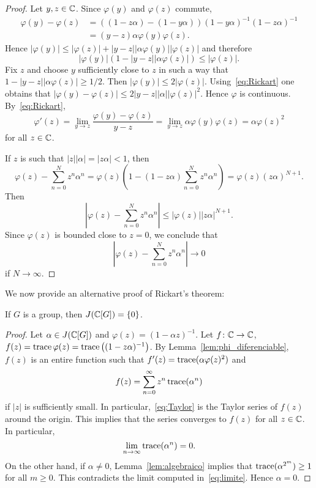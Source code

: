 \begin{proof}	
	Let $y,z\in\mathbb{C}$. Since $\varphi(y)$ and $\varphi(z)$ commute, 
	\begin{equation}
		\label{eq:Rickart}
		\begin{aligned}
			\varphi(y)-\varphi(z)&=\left( (1-z\alpha)-(1-y\alpha)\right)(1-y\alpha)^{-1}(1-z\alpha)^{-1}\\
			&=(y-z)\alpha\varphi(y)\varphi(z).
		\end{aligned}
	\end{equation}
	Hence $|\varphi(y)|\leq|\varphi(z)|+|y-z||\alpha\varphi(y)||\varphi(z)|$ and therefore 
	\[
		|\varphi(y)|\left( 1-|y-z||\alpha\varphi(z)|\right)\leq|\varphi(z)|.
	\]
	Fix $z$ and choose $y$ sufficiently close to $z$ in such a way that $1-|y-z||\alpha\varphi(z)|\geq1/2$. Then
	$|\varphi(y)|\leq2|\varphi(z)|$. Using~\eqref{eq:Rickart} one obtains that 
	$|\varphi(y)-\varphi(z)|\leq2|y-z||\alpha||\varphi(z)|^2$. 
	Hence $\varphi$ is continuous. By~\eqref{eq:Rickart}, 
	\[
	\varphi'(z)
	=\lim_{y\to z}\frac{\varphi(y)-\varphi(z)}{y-z}
	=\lim_{y\to z}\alpha\varphi(y)\varphi(z)
	=\alpha\varphi(z)^2
	\]
	for all $z\in\mathbb{C}$.

	If $z$ is such that $|z||\alpha|=|z\alpha|<1$, then  
	\[
		\varphi(z)-\sum_{n=0}^Nz^n\alpha^n
		=\varphi(z)\left(1-(1-z\alpha)\sum_{n=0}^Nz^n\alpha^n\right)
		=\varphi(z)(z\alpha)^{N+1}.
	\]
	Then 
	\[
		\left|\varphi(z)-\sum_{n=0}^Nz^n\alpha^n\right|\leq|\varphi(z)||z\alpha|^{N+1}.
	\]
	Since $\varphi(z)$ is bounded close to $z=0$, we conclude that 
	\[
 \left|\varphi(z)-\sum_{n=0}^Nz^n\alpha^n\right|\to0
 \]
 if $N\to\infty$.
\end{proof}

We now provide an alternative proof of Rickart's theorem: 

\begin{theorem}[Rickart]
	If $G$ is a group, then $J(\mathbb{C}[G])=\{0\}$.
\end{theorem}

\begin{proof}
	Let $\alpha\in J(\mathbb{C}[G])$ and $\varphi(z)=(1-\alpha z)^{-1}$. Let 
	$f\colon\mathbb{C}\to \mathbb{C}$, 
	$f(z)=\operatorname{trace}\varphi(z)=\operatorname{trace}\left((1-z\alpha)^{-1}\right)$. By Lemma~\ref{lem:phi_diferenciable},
	$f(z)$ is an entire function such that  $f'(z)=\operatorname{trace}(\alpha\varphi(z)^2)$ and 
	\begin{equation}
		\label{eq:Taylor}
		f(z)=\sum_{n=0}^\infty z^n\operatorname{trace}(\alpha^n)
	\end{equation}
	if $|z|$ is sufficiently small. In particular,~\eqref{eq:Taylor} is the Taylor series of $f(z)$ around the origin. This implies that the series converges to $f(z)$ for all $z\in\mathbb{C}$. In particular,
	\begin{equation}
		\label{eq:limite}
		\lim_{n\to\infty}\operatorname{trace}(\alpha^n)=0.
	\end{equation}
	On the other hand, if $\alpha\ne0$, Lemma~\ref{lem:algebraico} implies that 
	$\operatorname{trace}(\alpha^{2^m})\geq1$ for all $m\geq0$. This contradicts the limit computed in~\eqref{eq:limite}. Hence $\alpha=0$.
\end{proof}

